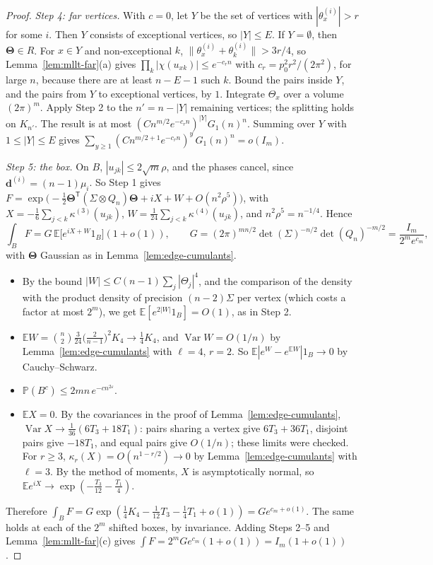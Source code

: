 \documentclass[11pt]{article}
\newcommand{\EE}{\mathbb{E}}
\newcommand{\PP}{\mathbb{P}}
\begin{document}
\begin{proof}
\emph{Step 4: far vertices.}
With \(c=0\), let \(Y\) be the set of vertices with \(|\theta^{(i)}_x|>r\) for some
\(i\). Then \(Y\) consists of exceptional vertices, so \(|Y|\le E\). If \(Y=\emptyset\),
then \(\boldsymbol\Theta\in R\).
For \(x\in Y\) and non-exceptional \(k\),
\(\|\theta^{(i)}_x+\theta^{(i)}_k\|>3r/4\), so
Lemma~\ref{lem:mllt-far}(a) gives
\(\prod_k|\chi(u_{xk})|\le e^{-c_rn}\) with \(c_r=p_0^2r^2/(2\pi^2)\), for large \(n\),
because there are at least \(n-E-1\) such \(k\).
Bound the pairs inside \(Y\), and the pairs from \(Y\) to exceptional vertices,
by \(1\). Integrate \(\Theta_x\) over a volume \((2\pi)^m\). Apply Step 2 to the
\(n'=n-|Y|\) remaining vertices; the splitting holds on \(K_{n'}\).
The result is at most \((C n^{m/2}e^{-c_rn})^{|Y|}G_1(n)^n\).
Summing over \(Y\) with \(1\le|Y|\le E\) gives
\(\sum_{y\ge1}(Cn^{m/2+1}e^{-c_rn})^y\,G_1(n)^n=o(I_m)\).

\emph{Step 5: the box.}
On \(B\), \(|u_{jk}|\le2\sqrt m\rho\), and the phases cancel, since
\(\boldsymbol d^{(i)}=(n-1)\mu_i\). So Step 1 gives
\(F=\exp\bigl(-\frac12\boldsymbol\Theta^{\mathsf T}(\Sigma\otimes Q_n)\boldsymbol\Theta+iX+W+O(n^2\rho^5)\bigr)\),
with \(X=-\frac16\sum_{j<k}\kappa^{(3)}(u_{jk})\), \(W=\frac1{24}\sum_{j<k}\kappa^{(4)}(u_{jk})\),
and \(n^2\rho^5=n^{-1/4}\). Hence
\[
\int_BF=G\,\EE\bigl[e^{iX+W}1_B\bigr](1+o(1)),
\qquad G=(2\pi)^{mn/2}\det(\Sigma)^{-n/2}\det(Q_n)^{-m/2}=\frac{I_m}{2^me^{c_m}},
\]
with \(\boldsymbol\Theta\) Gaussian as in Lemma~\ref{lem:edge-cumulants}.
\begin{itemize}
\item By the bound \(|W|\le C(n-1)\sum_j|\Theta_j|^4\), and the comparison of the
density with the product density of precision \((n-2)\Sigma\) per vertex
(which costs a factor at most \(2^{m}\)), we get \(\EE[e^{2|W|}1_B]=O(1)\), as in Step 2.
\item \(\EE W=\binom n2\frac{3}{24}\bigl(\frac2{n-1}\bigr)^2K_4\to\frac14K_4\), and
\(\operatorname{Var}W=O(1/n)\) by Lemma~\ref{lem:edge-cumulants} with \(\ell=4\), \(r=2\).
So \(\EE|e^W-e^{\EE W}|1_B\to0\) by Cauchy--Schwarz.
\item \(\PP(B^c)\le2mn\,e^{-cn^{2\varepsilon}}\).
\item \(\EE X=0\). By the covariances in the proof of
Lemma~\ref{lem:edge-cumulants}, \(\operatorname{Var}X\to\frac1{36}(6T_3+18T_1)\):
pairs sharing a vertex give \(6T_3+36T_1\), disjoint pairs give \(-18T_1\), and
equal pairs give \(O(1/n)\); these limits were checked.
For \(r\ge3\), \(\kappa_r(X)=O(n^{1-r/2})\to0\) by
Lemma~\ref{lem:edge-cumulants} with \(\ell=3\). By the method of moments,
\(X\) is asymptotically normal, so
\(\EE e^{iX}\to\exp(-\frac{T_3}{12}-\frac{T_1}4)\).
\end{itemize}
Therefore \(\int_BF=G\exp(\frac14K_4-\frac1{12}T_3-\frac14T_1+o(1))=Ge^{c_m+o(1)}\).
The same holds at each of the \(2^m\) shifted boxes, by invariance.
Adding Steps 2--5 and Lemma~\ref{lem:mllt-far}(c) gives
\(\int F=2^mGe^{c_m}(1+o(1))=I_m(1+o(1))\).
\end{proof}
\end{document}
